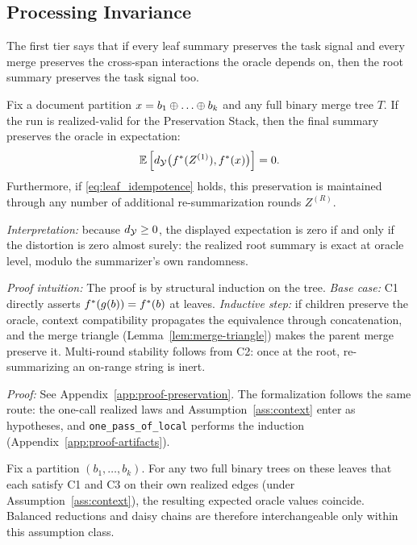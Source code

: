 \subsection{Processing Invariance}

The first tier says that if every leaf summary preserves the task signal and every merge preserves the cross-span interactions the oracle depends on, then the root summary preserves the task signal too.

\begin{theorem}\label{thm:one-pass}
Fix a document partition $x = b_1 \concat \dots \concat b_k$ and any full binary merge tree $T$. If the run is realized-valid for the Preservation Stack, then the final summary preserves the oracle in expectation:
\[
\mathbb{E}\left[d_{\mathcal{Y}}\big(f^\ast(Z^{(1)}), f^\ast(x)\big)\right] = 0.
\]
Furthermore, if \ref{eq:leaf_idempotence} holds, this preservation is maintained through any number of additional re-summarization rounds $Z^{(R)}$.
\end{theorem}

\noindent\textit{Interpretation:} because $d_{\mathcal{Y}} \ge 0$, the displayed expectation is zero if and only if the distortion is zero almost surely: the realized root summary is exact at oracle level, modulo the summarizer's own randomness.

\noindent\textit{Proof intuition:} The proof is by structural induction on the tree. \emph{Base case:} C1 directly asserts $f^\ast(g(b)) = f^\ast(b)$ at leaves. \emph{Inductive step:} if children preserve the oracle, context compatibility propagates the equivalence through concatenation, and the merge triangle (Lemma~\ref{lem:merge-triangle}) makes the parent merge preserve it. Multi-round stability follows from C2: once at the root, re-summarizing an on-range string is inert.

\noindent\textit{Proof:} See Appendix~\ref{app:proof-preservation}. The formalization follows the same route: the one-call realized laws and Assumption~\ref{ass:context} enter as hypotheses, and \texttt{one\_pass\_of\_local} performs the induction (Appendix~\ref{app:proof-artifacts}).

\begin{corollary}\label{cor:schedule}
Fix a partition $(b_1, \ldots, b_k)$. For any two full binary trees on these leaves that each satisfy C1 and C3 on their own realized edges (under Assumption~\ref{ass:context}), the resulting expected oracle values coincide. Balanced reductions and daisy chains are therefore interchangeable only within this assumption class.
\end{corollary}

